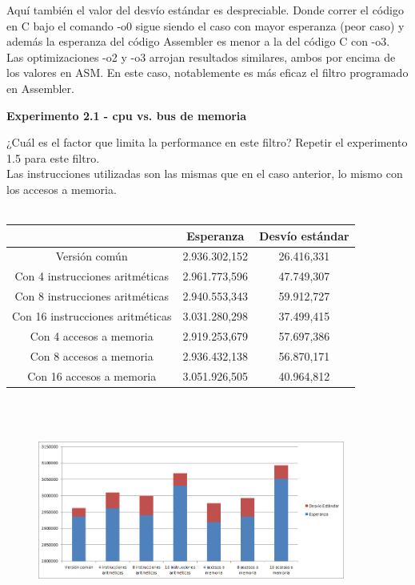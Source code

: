 Aqu\'i tambi\'en el valor del desv\'io est\'andar es despreciable. Donde correr el c\'odigo en C bajo el comando -o0 sigue siendo el caso con mayor esperanza (peor caso) y adem\'as la esperanza del c\'odigo Assembler es menor a la del c\'odigo C con -o3. Las optimizaciones -o2 y -o3 arrojan resultados similares, ambos por encima de los valores en ASM. En este caso, notablemente es m\'as eficaz el filtro programado en Assembler.



\newpage
\vspace*{0.3cm} \noindent
\textbf{Experimento 2.1 - cpu vs. bus de memoria}

¿Cuál es el factor que limita la performance en este filtro?
Repetir el experimento 1.5 para este filtro. \\

Las instrucciones utilizadas son las mismas que en el caso anterior, lo mismo con los accesos a memoria.\\
\\
 \begin{tabular}[c]{|c|c|c|}
	\hline
		 & Esperanza & Desv\'io est\'andar\\
		\hline
Versi\'on com\'un & 2.936.302,152 & 26.416,331 \\
\hline
Con 4 instrucciones aritméticas & 2.961.773,596 & 47.749,307 \\
\hline
Con 8 instrucciones aritméticas & 2.940.553,343 & 59.912,727 \\
\hline
Con 16 instrucciones aritméticas & 3.031.280,298 & 37.499,415 \\
\hline
Con 4 accesos a memoria & 2.919.253,679 & 57.697,386 \\
\hline
Con 8 accesos a memoria & 2.936.432,138 & 56.870,171 \\
\hline
Con 16 accesos a memoria & 3.051.926,505 & 40.964,812 \\
\hline
	\end{tabular}\\\\


\begin{figure}[h!]
  \begin{center}
	\includegraphics[width=0.9\textwidth]{imagenes/21B}
  \end{center}
\end{figure}

